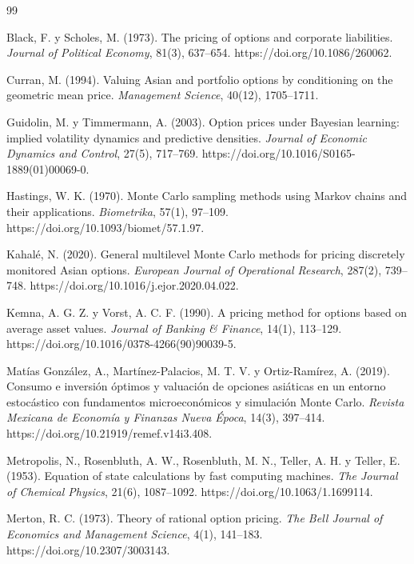 \documentclass[12pt,letterpaper]{article}
\begin{document}
\begin{thebibliography}{99}

Black, F. y Scholes, M. (1973). The pricing of options and corporate liabilities. \textit{Journal of Political Economy}, 81(3), 637--654. https://doi.org/10.1086/260062.

Curran, M. (1994). Valuing Asian and portfolio options by conditioning on the geometric mean price. \textit{Management Science}, 40(12), 1705--1711.

Guidolin, M. y Timmermann, A. (2003). Option prices under Bayesian learning: implied volatility dynamics and predictive densities. \textit{Journal of Economic Dynamics and Control}, 27(5), 717--769. https://doi.org/10.1016/S0165-1889(01)00069-0.

Hastings, W. K. (1970). Monte Carlo sampling methods using Markov chains and their applications. \textit{Biometrika}, 57(1), 97--109. https://doi.org/10.1093/biomet/57.1.97.

Kahalé, N. (2020). General multilevel Monte Carlo methods for pricing discretely monitored Asian options. \textit{European Journal of Operational Research}, 287(2), 739--748. https://doi.org/10.1016/j.ejor.2020.04.022.

Kemna, A. G. Z. y Vorst, A. C. F. (1990). A pricing method for options based on average asset values. \textit{Journal of Banking \& Finance}, 14(1), 113--129. https://doi.org/10.1016/0378-4266(90)90039-5.

Matías González, A., Martínez-Palacios, M. T. V. y Ortiz-Ramírez, A. (2019). Consumo e inversión óptimos y valuación de opciones asiáticas en un entorno estocástico con fundamentos microeconómicos y simulación Monte Carlo. \textit{Revista Mexicana de Economía y Finanzas Nueva Época}, 14(3), 397--414. https://doi.org/10.21919/remef.v14i3.408.

Metropolis, N., Rosenbluth, A. W., Rosenbluth, M. N., Teller, A. H. y Teller, E. (1953). Equation of state calculations by fast computing machines. \textit{The Journal of Chemical Physics}, 21(6), 1087--1092. https://doi.org/10.1063/1.1699114.

Merton, R. C. (1973). Theory of rational option pricing. \textit{The Bell Journal of Economics and Management Science}, 4(1), 141--183. https://doi.org/10.2307/3003143.


\end{thebibliography}
\end{document}
